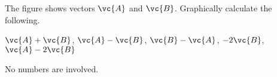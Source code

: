 The figure shows vectors $\vc{A}$ and $\vc{B}$. 
Graphically calculate the following.

         $\vc{A}+\vc{B}$,  $\vc{A}-\vc{B}$,  $\vc{B}-\vc{A}$,  $-2\vc{B}$,  $\vc{A}-2\vc{B}$

\noindent No numbers are involved.
